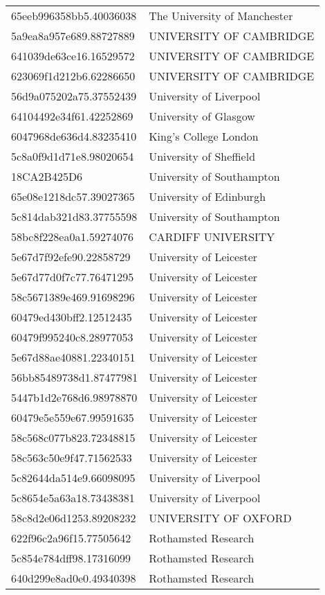\begin{tabular}{ll}
65eeb996358bb5.40036038 & The University of Manchester \\
5a9ea8a957e689.88727889 & UNIVERSITY OF CAMBRIDGE \\
641039de63ce16.16529572 & UNIVERSITY OF CAMBRIDGE \\
623069f1d212b6.62286650 & UNIVERSITY OF CAMBRIDGE \\
56d9a075202a75.37552439 & University of Liverpool \\
64104492e34f61.42252869 & University of Glasgow \\
6047968de636d4.83235410 & King's College London \\
5c8a0f9d1d71e8.98020654 & University of Sheffield \\
18CA2B425D6 & University of Southampton \\
65e08e1218dc57.39027365 & University of Edinburgh \\
5c814dab321d83.37755598 & University of Southampton \\
58bc8f228ea0a1.59274076 & CARDIFF UNIVERSITY \\
5e67d7f92efe90.22858729 & University of Leicester \\
5e67d77d0f7c77.76471295 & University of Leicester \\
58c5671389e469.91698296 & University of Leicester \\
60479ed430bff2.12512435 & University of Leicester \\
60479f995240c8.28977053 & University of Leicester \\
5e67d88ae40881.22340151 & University of Leicester \\
56bb85489738d1.87477981 & University of Leicester \\
5447b1d2e768d6.98978870 & University of Leicester \\
60479e5e559e67.99591635 & University of Leicester \\
58c568c077b823.72348815 & University of Leicester \\
58c563c50e9f47.71562533 & University of Leicester \\
5c82644da514e9.66098095 & University of Liverpool \\
5c8654e5a63a18.73438381 & University of Liverpool \\
58c8d2e06d1253.89208232 & UNIVERSITY OF OXFORD \\
622f96c2a96f15.77505642 & Rothamsted Research \\
5c854e784dff98.17316099 & Rothamsted Research \\
640d299e8ad0e0.49340398 & Rothamsted Research \\

\end{tabular}
